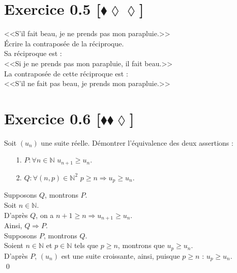 \documentclass[10pt]{article}
\begin{document}
\section*{Exercice 0.5 [$\blacklozenge\lozenge\lozenge$]}
\begin{tcolorbox}[enhanced, width=6in, center, size=fbox, fontupper=\large, drop shadow southwest]
    <<S'il fait beau, je ne prends pas mon parapluie.>>\\
    Écrire la contraposée de la réciproque.\\[0.5cm]
    Sa réciproque est :\\
    <<Si je ne prends pas mon parapluie, il fait beau.>>\\[0.5cm]
    La contraposée de cette réciproque est :\\
    <<S'il ne fait pas beau, je prends mon parapluie.>>
\end{tcolorbox}

\section*{Exercice 0.6 [$\blacklozenge\blacklozenge\lozenge$]}
\begin{tcolorbox}[enhanced, width=6in, center, size=fbox, fontupper=\large, drop shadow southwest]
    Soit $(u_n)$ une suite réelle. Démontrer l'équivalence des deux assertions :
    \begin{itemize}
        \item[1.] $P:\forall{n\in\mathbb{N}}$ \hspace{0.25cm} $u_{n+1} \geq u_n$. 
        \item[2.] $Q:\forall{(n,p)\in\mathbb{N}^2}$ \hspace{0.25cm} $p \geq n \Longrightarrow u_p \geq u_n$. 
    \end{itemize}
    Supposons $Q$, montrons $P$.\\
    Soit $n\in\mathbb{N}$.\\
    D'après $Q$, on a $n+1\geq n \Longrightarrow u_{n+1} \geq u_n$.\\
    Ainsi, $Q\Longrightarrow P$.\\[0.5cm]
    Supposons $P$, montrons $Q$.\\
    Soient $n\in\mathbb{N}$ et $p\in\mathbb{N}$ tels que $p\geq n$, montrons que $u_p\geq u_n$.\\
    D'après $P$, $(u_n)$ est une suite croissante, ainsi, puisque $p\geq n$ : $u_p\geq u_n$.\\
    \qed
    \end{tcolorbox}
\end{document}
